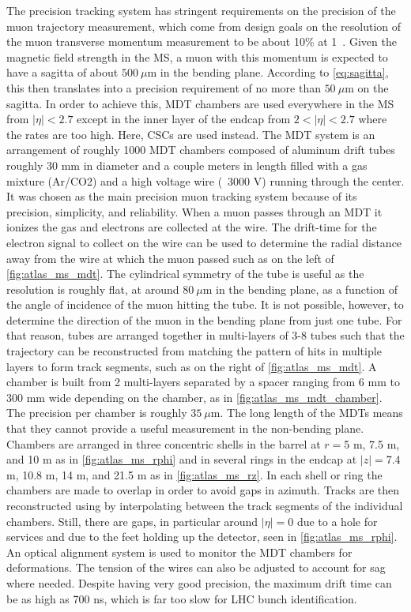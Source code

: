 
The precision tracking system has stringent requirements
on the precision of the muon trajectory measurement, 
which come from design goals on the resolution of the muon
transverse momentum measurement to be 
about 10\% at 1~\TeV.
Given the magnetic field strength in the MS, a muon 
with this momentum is expected to have a sagitta
of about $500~\mu$m in the bending plane. 
According to \eqn\eqref{eq:sagitta},
this then translates into a precision requirement of 
no more than $50~\mu$m on the sagitta.
In order to achieve this, MDT chambers are used everywhere 
in the MS from $|\eta|<2.7$ except in the inner layer of the 
endcap from $2<|\eta|<2.7$
where the rates are too high. Here, CSCs are used instead. 
The MDT system is an arrangement of roughly 1000 MDT chambers composed
of aluminum drift tubes roughly 30 mm in diameter and a couple meters in length 
filled with a gas mixture
(Ar/CO2) and a high voltage wire (~3000 V)
running through the center. 
It was chosen as the main precision muon tracking system
because of its precision, simplicity, and reliability.
When a muon passes through an MDT
it ionizes the gas and electrons are collected at the wire.
The drift-time for the electron signal to collect on the wire
can be used to determine the radial distance away from the wire
at which the muon passed such as on the left of \fig\ref{fig:atlas_ms_mdt}. 
The cylindrical symmetry
of the tube is useful as the resolution is roughly flat, at around
$80~\mu$m in the bending plane, as a function
of the angle of incidence of the muon hitting the tube. 
It is not possible, however, to determine the direction
of the muon in the bending plane from just one tube.  For that reason, 
tubes are arranged together in multi-layers of 3-8 tubes such that 
the trajectory
can be reconstructed from matching the pattern of hits in multiple layers
to form track segments,
such as on the right of \fig\ref{fig:atlas_ms_mdt}.
A chamber is built from 2 multi-layers separated by a spacer ranging from
6 mm to 300 mm wide depending on 
the chamber, as in \fig\ref{fig:atlas_ms_mdt_chamber}.
The precision per chamber is roughly $35~\mu$m.
The long length of the MDTs means that they cannot provide a  useful measurement
in the non-bending plane.
Chambers are arranged in three concentric shells in the barrel 
at $r = $5 m, 7.5 m, and 10 m as in \fig\ref{fig:atlas_ms_rphi} 
and in several rings in the endcap
at $|z| = $7.4 m, 10.8 m, 14 m, and 21.5 m as in \fig\ref{fig:atlas_ms_rz}.
In each shell or ring
the chambers are made to overlap in order to avoid gaps in azimuth.
Tracks  are then reconstructed using by interpolating between the 
track segments of the individual chambers.
Still, there are gaps, in particular around $|\eta|=0$ due to a hole for services
and due to the feet holding up the detector, seen in \fig\ref{fig:atlas_ms_rphi}.
An optical alignment system is used to monitor the MDT chambers %
for deformations. The tension of the wires can also be adjusted
to account for sag where needed. %
Despite having very good precision, the maximum drift time
can be as high as 700 ns, which is far too slow for LHC bunch identification.


